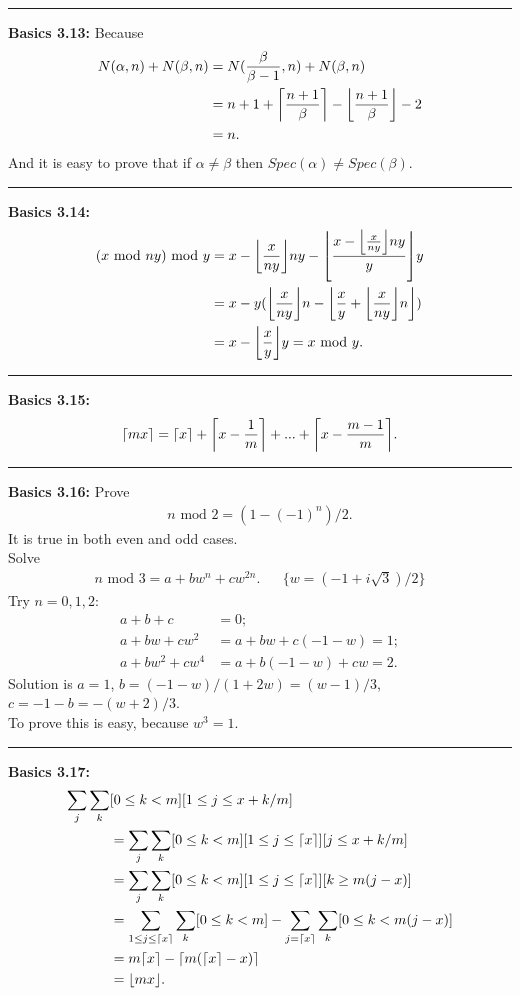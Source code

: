 \documentclass{article}
\DeclarePairedDelimiter\ceil{\lceil}{\rceil}
\DeclarePairedDelimiter\floor{\lfloor}{\rfloor}
\begin{document}
\noindent\rule{\textwidth}{0.4pt}
\textbf{Basics 3.13:}
Because
\begin{align}
N(\alpha,n) + N(\beta,n) &= N(\frac{\beta}{\beta-1},n) + N(\beta,n) \\
			 &= n+1 + \ceil*{\frac{n+1}{\beta}} - \floor*{\frac{n+1}{\beta}} - 2 \\
			 &= n.
\end{align}
And it is easy to prove that if $\alpha \neq \beta$ then $Spec(\alpha) \neq Spec(\beta)$.

\noindent\rule{\textwidth}{0.4pt}
\textbf{Basics 3.14:}
\begin{align}
(x \text{ mod } ny) \text{ mod } y &= x - \floor*{\frac{x}{ny}}ny - \floor*{\frac{x - \floor*{\frac{x}{ny}}ny }{y}}y \\
				   &= x - y(\floor*{\frac{x}{ny}}n - \floor*{\frac{x}{y} + \floor*{\frac{x}{ny}}n}) \\
				   &= x - \floor*{\frac{x}{y}}y = x \text{ mod } y.
\end{align}

\noindent\rule{\textwidth}{0.4pt}
\textbf{Basics 3.15:}
\begin{align}
\ceil{mx} = \ceil*{x} + \ceil*{x - \frac{1}{m}} +  ... + \ceil*{x - \frac{m - 1}{m}}.
\end{align}

\noindent\rule{\textwidth}{0.4pt}
\textbf{Basics 3.16:}
Prove
\begin{align}
n \text{ mod } 2 = (1 - (-1)^n)/2.
\end{align}
It is true in both even and odd cases.\\
Solve
\begin{align}
n \text{ mod } 3 = a + bw^n + cw^{2n}. && \{w = (-1 + i\sqrt{3})/2\}
\end{align}
Try $n = 0,1,2$:
\begin{align}
a + b + c &= 0; \\
a + bw + cw^2 &= a + bw + c(-1-w) = 1; \\
a + bw^2 + cw^4 &= a + b(-1-w) + cw = 2.
\end{align}
Solution is $a = 1$, $b =(-1-w)/(1+2w) = (w-1)/3$, $c = -1-b = -(w+2)/3$.\\
To prove this is easy, because $w^3 = 1$.

\noindent\rule{\textwidth}{0.4pt}
\textbf{Basics 3.17:}
\begin{align}
\sum_j \sum_k &[0 \le k < m][1 \le j \le x + k/m] \\
	&= \sum_j \sum_k [0 \le k < m][1 \le j \le \ceil{x}][j \le x + k/m] \\
	&= \sum_j \sum_k [0 \le k < m][1 \le j \le \ceil{x}][ k \ge m(j-x)] \\
	&= \sum_{1 \le j \le \ceil{x}} \sum_k [0 \le k < m] - \sum_{j=\ceil{x}} \sum_k [0 \le k < m(j-x)] \\
	&= m\ceil{x} - \ceil{m(\ceil{x}-x)} \\
	&= \floor{mx}.
\end{align}
\end{document}
